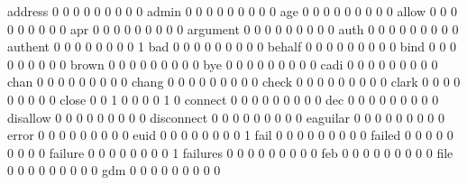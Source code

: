 \documentclass[compress,8pt]{beamer}
\begin{document}
\begin{frame}
\begin{Schunk}
  address                                    0   0   0   0   0   0   0   0   0
  admin                                      0   0   0   0   0   0   0   0   0
  age                                        0   0   0   0   0   0   0   0   0
  allow                                      0   0   0   0   0   0   0   0   0
  apr                                        0   0   0   0   0   0   0   0   0
  argument                                   0   0   0   0   0   0   0   0   0
  auth                                       0   0   0   0   0   0   0   0   0
  authent                                    0   0   0   0   0   0   0   0   1
  bad                                        0   0   0   0   0   0   0   0   0
  behalf                                     0   0   0   0   0   0   0   0   0
  bind                                       0   0   0   0   0   0   0   0   0
  brown                                      0   0   0   0   0   0   0   0   0
  bye                                        0   0   0   0   0   0   0   0   0
  cadi                                       0   0   0   0   0   0   0   0   0
  chan                                       0   0   0   0   0   0   0   0   0
  chang                                      0   0   0   0   0   0   0   0   0
  check                                      0   0   0   0   0   0   0   0   0
  clark                                      0   0   0   0   0   0   0   0   0
  close                                      0   0   1   0   0   0   0   1   0
  connect                                    0   0   0   0   0   0   0   0   0
  dec                                        0   0   0   0   0   0   0   0   0
  disallow                                   0   0   0   0   0   0   0   0   0
  disconnect                                 0   0   0   0   0   0   0   0   0
  eaguilar                                   0   0   0   0   0   0   0   0   0
  error                                      0   0   0   0   0   0   0   0   0
  euid                                       0   0   0   0   0   0   0   0   1
  fail                                       0   0   0   0   0   0   0   0   0
  failed                                     0   0   0   0   0   0   0   0   0
  failure                                    0   0   0   0   0   0   0   0   1
  failures                                   0   0   0   0   0   0   0   0   0
  feb                                        0   0   0   0   0   0   0   0   0
  file                                       0   0   0   0   0   0   0   0   0
  gdm                                        0   0   0   0   0   0   0   0   0

\end{Schunk}
\end{frame}
\end{document}
